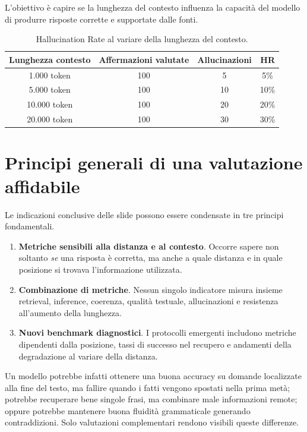 L'obiettivo è capire se la lunghezza del contesto influenza la capacità del modello di produrre risposte corrette e supportate dalle fonti.

\begin{table}[h]
    \centering
    \begin{tabular}{|c|c|c|c|}
        \hline
        \textbf{Lunghezza contesto} & \textbf{Affermazioni valutate} & \textbf{Allucinazioni} & \textbf{HR} \\
        \hline
        1.000 token & 100 & 5 & 5\% \\
        \hline
        5.000 token & 100 & 10 & 10\% \\
        \hline
        10.000 token & 100 & 20 & 20\% \\
        \hline
        20.000 token & 100 & 30 & 30\% \\
        \hline
    \end{tabular}
    \caption{Hallucination Rate al variare della lunghezza del contesto.}
    \label{tab:hallucination_rate}
\end{table}

\section{Principi generali di una valutazione affidabile}

Le indicazioni conclusive delle slide possono essere condensate in tre principi fondamentali.

\begin{enumerate}
\item \textbf{Metriche sensibili alla distanza e al contesto}. Occorre sapere non soltanto \emph{se} una risposta è corretta, ma anche a quale distanza e in quale posizione si trovava l'informazione utilizzata.
\item \textbf{Combinazione di metriche}. Nessun singolo indicatore misura insieme retrieval, inference, coerenza, qualità testuale, allucinazioni e resistenza all'aumento della lunghezza.
\item \textbf{Nuovi benchmark diagnostici}. I protocolli emergenti includono metriche dipendenti dalla posizione, tassi di successo nel recupero e andamenti della degradazione al variare della distanza.
\end{enumerate}

Un modello potrebbe infatti ottenere una buona accuracy su domande localizzate alla fine del testo, ma fallire quando i fatti vengono spostati nella prima metà; potrebbe recuperare bene singole frasi, ma combinare male informazioni remote; oppure potrebbe mantenere buona fluidità grammaticale generando contraddizioni. Solo valutazioni complementari rendono visibili queste differenze.


